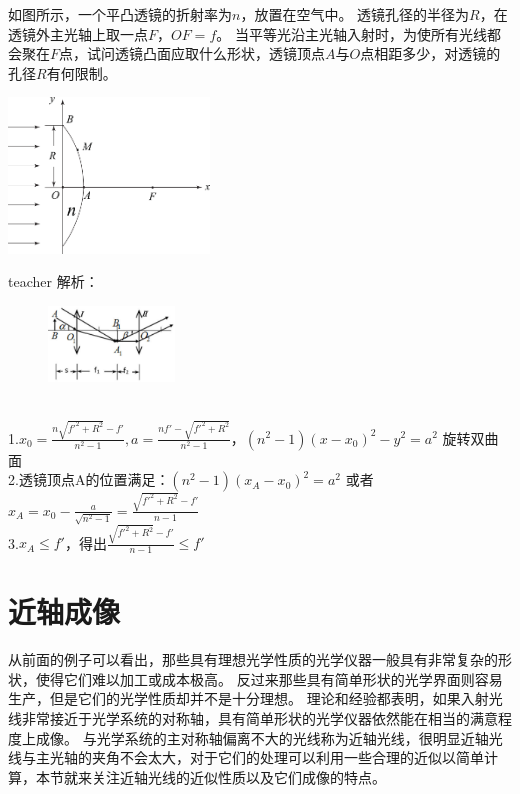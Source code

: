 \begin{example}
	如图所示，一个平凸透镜的折射率为$n$，放置在空气中。
	透镜孔径的半径为$R$，在透镜外主光轴上取一点$F$，$OF = f$。
	当平等光沿主光轴入射时，为使所有光线都会聚在$F$点，试问透镜凸面应取什么形状，透镜顶点$A$与$O$点相距多少，对透镜的孔径$R$有何限制。
		\begin{flushright}
			\includegraphics[width = 0.4\textwidth]{images/opt-8.pdf} 
		\end{flushright}
	
	\begin{taggedblock}{teacher}
		\noindent
		解析：
			\begin{figure}[hbtp]
					\includegraphics[width = 0.3\textwidth]{images/opt-6-5.pdf} 
				\end{figure}
		\\1.$x_0=\frac{n\sqrt{f'^2+R^2}-f'}{n^2-1},a=\frac{nf'-\sqrt{f'^2+R^2}}{n^2-1}$，$(n^2-1)(x-x_0)^2-y^2=a^2$ 旋转双曲面
		\\2.透镜顶点A的位置满足：$(n^2-1)(x_A-x_0)^2=a^2$ 或者$x_A=x_0-\frac{a}{\sqrt{n^2-1}}=\frac{\sqrt{f'^2+R^2}-f'}{n-1}$
		\\3.$x_A\leq f'$，得出$\frac{\sqrt{f'^2+R^2}-f'}{n-1}\leq f'$
	\end{taggedblock}
\end{example}

\section{近轴成像}

从前面的例子可以看出，那些具有理想光学性质的光学仪器一般具有非常复杂的形状，使得它们难以加工或成本极高。
反过来那些具有简单形状的光学界面则容易生产，但是它们的光学性质却并不是十分理想。
理论和经验都表明，如果入射光线非常接近于光学系统的对称轴，具有简单形状的光学仪器依然能在相当的满意程度上成像。
与光学系统的主对称轴偏离不大的光线称为近轴光线，很明显近轴光线与主光轴的夹角不会太大，对于它们的处理可以利用一些合理的近似以简单计算，本节就来关注近轴光线的近似性质以及它们成像的特点。

